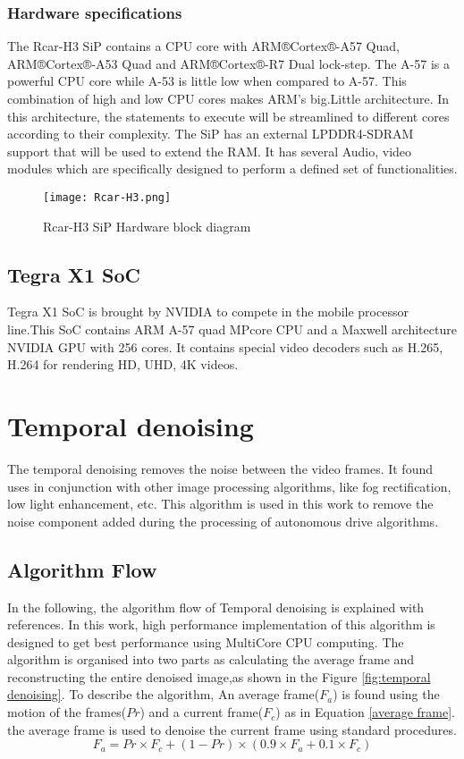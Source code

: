 \subsubsection{Hardware specifications} 
The Rcar-H3 SiP contains a CPU core with ARM®Cortex®-A57 Quad, ARM®Cortex®-A53 Quad and ARM®Cortex®-R7 Dual lock-step. The A-57 is a powerful CPU core while A-53 is little low when compared to A-57. This combination of high and low CPU cores makes ARM’s big.Little architecture. In this architecture, the statements to execute will be streamlined to different cores according to their complexity. The SiP has an external LPDDR4-SDRAM support that will be used to extend the RAM. It has several Audio, video modules which are specifically designed to perform a defined set of functionalities.
\begin{figure}[h!]
	\centering
	\texttt{[image: Rcar-H3.png]}
	\caption{Rcar-H3 SiP Hardware block diagram}
	\label{fig:Rcar-H3}
\end{figure}
\subsection{Tegra X1 SoC}
Tegra X1 SoC is brought by NVIDIA to compete in the mobile processor line.This SoC contains ARM A-57 quad MPcore  CPU and a Maxwell architecture NVIDIA GPU with 256 cores. It contains special video decoders such as H.265, H.264 for rendering HD, UHD, 4K videos.
\section{Temporal denoising}
The temporal denoising removes the noise between the video frames. It found uses in conjunction with other image processing algorithms, like fog rectification, low light enhancement, etc. This algorithm is used in this work to remove the noise component added during the processing of autonomous drive algorithms. 
\subsection{Algorithm Flow}
In the following, the algorithm flow of Temporal denoising is explained with references. In this work, high performance implementation of this algorithm is designed to get best performance using MultiCore CPU computing.
The algorithm is organised into two parts as calculating the average frame and reconstructing the entire denoised image,as shown in the Figure \ref{fig:temporal denoising}. To describe the algorithm, An average frame($F_a$) is found using the motion of the frames($Pr$) and a current frame($F_c$) as in Equation \ref{average frame}. the average frame is used to denoise the current frame using standard procedures. 
\begin{equation}\label{average frame}
F_a = Pr \times F_c + (1-Pr)\times (0.9 \times F_a + 0.1 \times F_c)
\end{equation}
